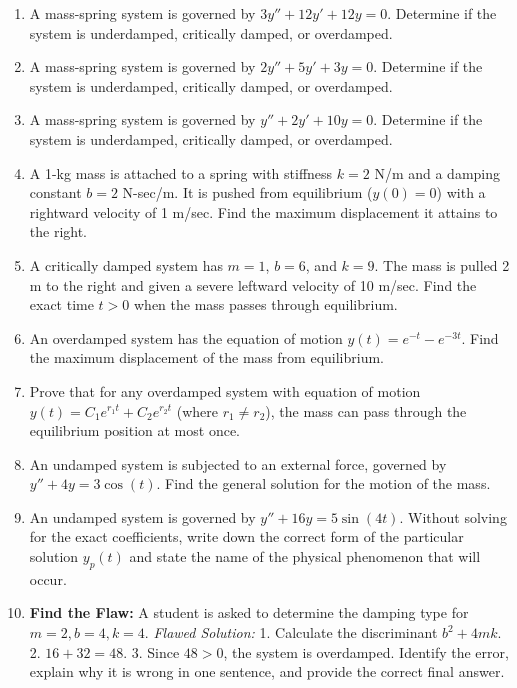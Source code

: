 \documentclass[11pt]{article}
\begin{document}
\begin{enumerate}[label=\textbf{\arabic*.}]
    \item A mass-spring system is governed by $3y'' + 12y' + 12y = 0$. Determine if the system is underdamped, critically damped, or overdamped.
    \item A mass-spring system is governed by $2y'' + 5y' + 3y = 0$. Determine if the system is underdamped, critically damped, or overdamped.
    \item A mass-spring system is governed by $y'' + 2y' + 10y = 0$. Determine if the system is underdamped, critically damped, or overdamped.
    
    \item A 1-kg mass is attached to a spring with stiffness $k = 2$ N/m and a damping constant $b = 2$ N-sec/m. It is pushed from equilibrium ($y(0)=0$) with a rightward velocity of 1 m/sec. Find the maximum displacement it attains to the right.
    \item A critically damped system has $m=1$, $b=6$, and $k=9$. The mass is pulled 2 m to the right and given a severe leftward velocity of 10 m/sec. Find the exact time $t > 0$ when the mass passes through equilibrium.
    \item An overdamped system has the equation of motion $y(t) = e^{-t} - e^{-3t}$. Find the maximum displacement of the mass from equilibrium.
    
    \item Prove that for any overdamped system with equation of motion $y(t) = C_1 e^{r_1 t} + C_2 e^{r_2 t}$ (where $r_1 \neq r_2$), the mass can pass through the equilibrium position at most once.
    
    \item An undamped system is subjected to an external force, governed by $y'' + 4y = 3\cos(t)$. Find the general solution for the motion of the mass.
    \item An undamped system is governed by $y'' + 16y = 5\sin(4t)$. Without solving for the exact coefficients, write down the correct form of the particular solution $y_p(t)$ and state the name of the physical phenomenon that will occur.
    
    \item \textbf{Find the Flaw:} A student is asked to determine the damping type for $m=2, b=4, k=4$. 
    \textit{Flawed Solution:} 1. Calculate the discriminant $b^2 + 4mk$. 2. $16 + 32 = 48$. 3. Since $48 > 0$, the system is overdamped. 
    Identify the error, explain why it is wrong in one sentence, and provide the correct final answer.
    

\end{enumerate}
\end{document}
